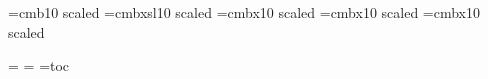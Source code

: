 \def\tenpoint{\def\rm{\fam0\tenrm}
    \textfont0=\tenrm \scriptfont0=\sevenrm \scriptscriptfont0=\fiverm
    \textfont1=\teni  \scriptfont1=\seveni  \scriptscriptfont1=\fivei
    \textfont2=\tensy \scriptfont2=\sevensy \scriptscriptfont2=\fivesy
    \textfont\itfam=\tenit  \def\it{\fam\itfam\tenit}
    \textfont\ttfam=\tentt  \def\tt{\fam\ttfam\tentt}
    \textfont\bffam=\tenbf  \scriptfont\bffam=\sevenbf
      \scriptscriptfont\bffam=\fivebf   \def\bf{\fam\bffam\tenbf}
    \normalbaselineskip=12pt
    \setbox\strutbox=\hbox{\vrule height8.5pt depth3.5pt width0pt}
    \normalbaselines\rm}
\def\eightpoint{\def\rm{\fam0\eightrm}
    \textfont0=\eightrm \scriptfont0=\sixrm \scriptscriptfont0=\fiverm
    \textfont1=\eighti  \scriptfont1=\sixi  \scriptscriptfont1=\fivei
    \textfont2=\eightsy \scriptfont2=\sixsy \scriptscriptfont2=\fivesy
    \textfont\itfam=\eightit  \def\it{\fam\itfam\eightit}
    \textfont\ttfam=\eighttt  \def\tt{\fam\ttfam\eighttt}
    \textfont\bffam=\eightbf  \scriptfont\bffam=\sixbf
      \scriptscriptfont\bffam=\fivebf  \def\bf{\fam\bffam\eightbf}
    \normalbaselineskip=9pt
    \setbox\strutbox=\hbox{\vrule height7pt depth2pt width0pt}
    \normalbaselines\rm}



\font\secfont=cmb10 scaled
\font\bit=cmbxsl10 scaled
\font\big=cmbx10 scaled
\font\bigger=cmbx10 scaled
\font\biggest=cmbx10 scaled

\headline={\ifnum{} \else \firstmark \fi}
\footline={\hfil}
\def\deg{\ifmmode^\circ\else$^\circ$\fi}
\def\solar{\ifmmode_{\mathord\odot}\else$_{\mathord\odot}$\fi}
\def\esc{\hbox{$\langle$esc\/$\rangle$}}
\newtoks\chapnum
\newcount\sectnum
\newwrite\toc
\openout\toc=toc
\def\beginChapter#1#2#3{\bgroup\chapnum={#1}\pageno=1\mark{\hfil}
    \sectnum=0\centerline{\bit #3 #1}
    \write\toc{\noexpand\itemchapter #1/#2/\the\chapnum-\the\count0.}
    \vskip 0.3in\centerline{\big #2}
    \mark{\noexpand\ifodd \noexpand\pageno  
                        \noexpand\eightrm 
                        \noexpand\hfil #2
                        \noexpand\qquad#1-\noexpand\folio 
        \noexpand\else  
                        \noexpand\eightrm#1-\noexpand\folio 
                        \noexpand\qquad #2
                        \noexpand\hfil 
        \noexpand\fi}
    \vskip 0.5in\elevenpoint
    }

